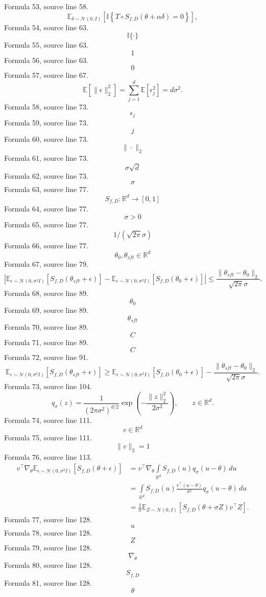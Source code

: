 \documentclass{ctexart}
\begin{document}
Formula 53, source line 58.
\[
\mathbb E_{\delta\sim\mathcal N(0,I)}
\left[\mathbb I\left\{T\circ S_{f,D}(\theta+\alpha\delta)=0\right\}\right],
\]
Formula 54, source line 63.
\[\mathbb I\{\cdot\}\]
Formula 55, source line 63.
\[1\]
Formula 56, source line 63.
\[0\]
Formula 57, source line 67.
\[
\mathbb E\left[\|\epsilon\|_2^2\right]
=\sum\limits_{j=1}^{d}\mathbb E\left[\epsilon_j^2\right]
=d\sigma^2.
\]
Formula 58, source line 73.
\[\epsilon_j\]
Formula 59, source line 73.
\[j\]
Formula 60, source line 73.
\[\|\cdot\|_2\]
Formula 61, source line 73.
\[\sigma\sqrt d\]
Formula 62, source line 73.
\[\sigma\]
Formula 63, source line 77.
\[S_{f,D}:\mathbb R^d\to[0,1]\]
Formula 64, source line 77.
\[\sigma>0\]
Formula 65, source line 77.
\[1/(\sqrt{2\pi}\sigma)\]
Formula 66, source line 77.
\[\theta_0,\theta_{sft}\in\mathbb R^d\]
Formula 67, source line 79.
\[
\left|
\mathbb E_{\epsilon\sim\mathcal N(0,\sigma^2I)}
\left[S_{f,D}(\theta_{sft}+\epsilon)\right]
-\mathbb E_{\epsilon\sim\mathcal N(0,\sigma^2I)}
\left[S_{f,D}(\theta_0+\epsilon)\right]
\right|
\leq\frac{\|\theta_{sft}-\theta_0\|_2}{\sqrt{2\pi}\sigma}.
\]
Formula 68, source line 89.
\[\theta_0\]
Formula 69, source line 89.
\[\theta_{sft}\]
Formula 70, source line 89.
\[C\]
Formula 71, source line 89.
\[C\]
Formula 72, source line 91.
\[
\mathbb E_{\epsilon\sim\mathcal N(0,\sigma^2I)}
\left[S_{f,D}(\theta_{sft}+\epsilon)\right]
\geq
\mathbb E_{\epsilon\sim\mathcal N(0,\sigma^2I)}
\left[S_{f,D}(\theta_0+\epsilon)\right]
-\frac{\|\theta_{sft}-\theta_0\|_2}{\sqrt{2\pi}\sigma}.
\]
Formula 73, source line 104.
\[
q_\sigma(z)
=\frac{1}{(2\pi\sigma^2)^{d/2}}
\exp\left(-\frac{\|z\|_2^2}{2\sigma^2}\right),
\qquad z\in\mathbb R^d.
\]
Formula 74, source line 111.
\[v\in\mathbb R^d\]
Formula 75, source line 111.
\[\|v\|_2=1\]
Formula 76, source line 113.
\[
\begin{aligned}
v^\top\nabla_\theta
\mathbb E_{\epsilon\sim\mathcal N(0,\sigma^2I)}
\left[S_{f,D}(\theta+\epsilon)\right]
&=v^\top\nabla_\theta
\int\limits_{\mathbb R^d}S_{f,D}(u)q_\sigma(u-\theta)\,du\\
&=\int\limits_{\mathbb R^d}S_{f,D}(u)
\frac{v^\top(u-\theta)}{\sigma^2}q_\sigma(u-\theta)\,du\\
&=\frac{1}{\sigma}
\mathbb E_{Z\sim\mathcal N(0,I)}
\left[S_{f,D}(\theta+\sigma Z)v^\top Z\right].
\end{aligned}
\]
Formula 77, source line 128.
\[u\]
Formula 78, source line 128.
\[Z\]
Formula 79, source line 128.
\[\nabla_\theta\]
Formula 80, source line 128.
\[S_{f,D}\]
Formula 81, source line 128.
\[\theta\]
\end{document}
